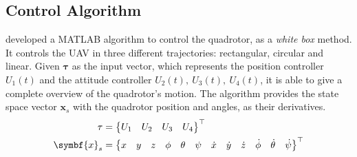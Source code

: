\subsection{Control Algorithm}

\textcite{geronel2023} developed a MATLAB algorithm to control the quadrotor, as a \emph{white box} method. 
It controls the UAV in three different trajectories: rectangular, circular and linear.
Given \(\symbf{\tau}\) as the input vector, which represents the position controller \(U_1(t)\) and the attitude controller \(U_2(t),\ U_3(t),\ U_4(t)\), it is able to give a complete overview of the quadrotor's motion.
The algorithm provides the state space vector \(\symbf{x}_s\) with the quadrotor position and angles, as their derivatives.
%
\begin{align}
    \tau &= \begin{Bmatrix}
        U_1 & U_2 & U_3 & U_4
    \end{Bmatrix}^{\top} \\
    \setcounter{MaxMatrixCols}{13}
    \symbf{x}_s &=
    \begin{Bmatrix}
        x&y&z&\phi&\theta&\psi&\dot{x}&\dot{y}&\dot{z}&\dot{\phi}&\dot{\theta}&\dot{\psi}
    \end{Bmatrix}^{\top}
    \label{eq:xs_vector_matlab}
\end{align}